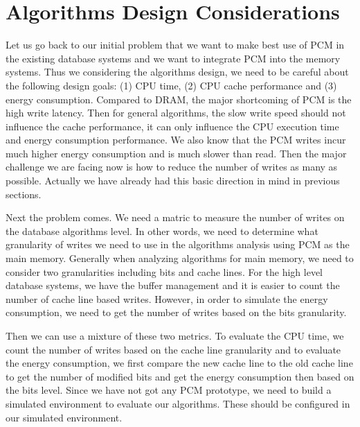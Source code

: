 \section{Algorithms Design Considerations}

Let us go back to our initial problem that we want to make best use of PCM in the existing database systems and we want to integrate PCM into the memory systems. Thus we considering the algorithms design, we need to be careful about the following design goals: (1) CPU time, (2) CPU cache performance and (3) energy consumption. Compared to DRAM, the major shortcoming of PCM is the high write latency. Then for general algorithms, the slow write speed should not influence the cache performance, it can only influence the CPU execution time and energy consumption performance. We also know that the PCM writes incur much higher energy consumption and is much slower than read. Then the major challenge we are facing now is how to reduce the number of writes as many as possible. Actually we have already had this basic direction in mind in previous sections. 

Next the problem comes. We need a matric to measure the number of writes on the database algorithms level. In other words, we need to determine what granularity of writes we need to use in the algorithms analysis using PCM as the main memory. Generally when analyzing algorithms for main memory, we need to consider two granularities including bits and cache lines. For the high level database systems, we have the buffer management and it is easier to count the number of cache line based writes. However, in order to simulate the energy consumption, we need to get the number of writes based on the bits granularity.

Then we can use a mixture of these two metrics. To evaluate the CPU time, we count the number of writes based on the cache line granularity and to evaluate the energy consumption, we first compare the new cache line to the old cache line to get the number of modified bits and get the energy consumption then based on the bits level. Since we have not got any PCM prototype, we need to build a simulated environment to evaluate our algorithms. These should be configured in our simulated environment. 


